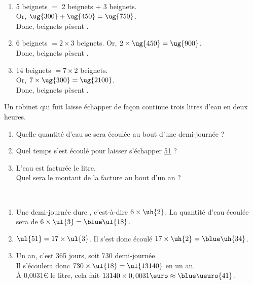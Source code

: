 \begin{colonne*exercice}
\begin{corrige}
   \ \\ [-5mm]\begin{enumerate}
      \item 5 beignets $=$ 2 beignets $+$ 3 beignets. \\
         Or, $\ug{300}+\ug{450} =\ug{750}$. \\
         Donc, { beignets pèsent }.
      \item 6 beignets $=2\times3$ beignets.
         Or, $2\times\ug{450} = \ug{900}$. \\
         Donc, { beignets pèsent }.
      \item 14 beignets $=7\times2$ beignets. \\
         Or, $7\times\ug{300} =\ug{2100}$. \\
         Donc, { beignets pèsent }.
   \end{enumerate}
\end{corrige}

\bigskip


\begin{exercice} %
   Un robinet qui fuit laisse échapper de façon continue trois litres d’eau en deux heures.
   \begin{enumerate}
      \item Quelle quantité d’eau se sera écoulée au bout d’une demi-journée ?
      \item Quel temps s’est écoulé pour laisser s’échapper \ul{51} ?
      \item L’eau est facturée  le litre. \\
         Quel sera le montant de la facture au bout d’un an ?
   \end{enumerate}
\end{exercice}

\begin{corrige}
   \ \\ [-5mm]
   \begin{enumerate}
      \item Une demi-journée dure , c'est-à-dire $6\times\uh{2}$. La quantité d'eau écoulée sera de $6\times\ul{3} =\blue \ul{18}$.
      \item $\ul{51} =17\times\ul{3}$. Il s'est donc écoulé $17\times\uh{2} =\blue \uh{34}$.
      \item Un an, c'est 365 jours, soit 730 demi-journée. \\
         Il s'écoulera donc $730\times\ul{18} =\ul{13140}$ en un an. \\
         À 0,0031\euro{} le litre, cela fait $13140\times0,0031\text{\euro} \approx\blue \ueuro{41}$.
   \end{enumerate}
\end{corrige}


\end{colonne*exercice}
